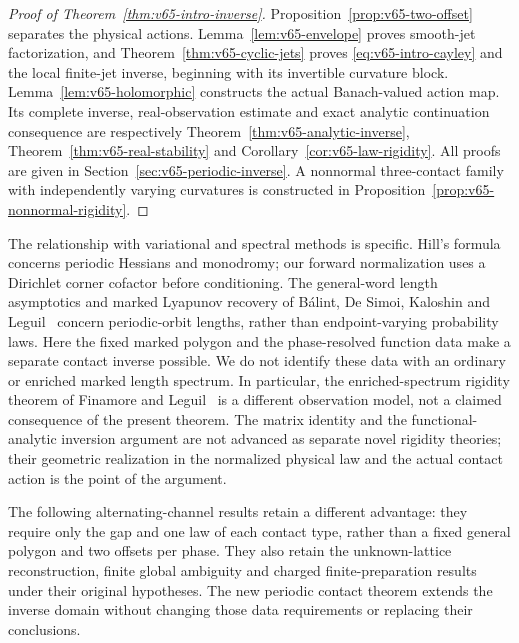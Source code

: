 \begin{proof}[Proof of Theorem~\ref{thm:v65-intro-inverse}]
Proposition~\ref{prop:v65-two-offset} separates the physical actions.
Lemma~\ref{lem:v65-envelope} proves smooth-jet factorization, and
Theorem~\ref{thm:v65-cyclic-jets} proves \eqref{eq:v65-intro-cayley}
and the local finite-jet inverse, beginning with its invertible
curvature block.  Lemma~\ref{lem:v65-holomorphic} constructs the
actual Banach-valued action map.  Its complete inverse, real-observation
estimate and exact analytic continuation consequence are respectively
Theorem~\ref{thm:v65-analytic-inverse},
Theorem~\ref{thm:v65-real-stability} and
Corollary~\ref{cor:v65-law-rigidity}.  All proofs are given in
Section~\ref{sec:v65-periodic-inverse}.  A nonnormal three-contact
family with independently varying curvatures is constructed in
Proposition~\ref{prop:v65-nonnormal-rigidity}.
\end{proof}

The relationship with variational and spectral methods is specific.
Hill's formula~\cite{Hill} concerns periodic Hessians and monodromy;
our forward normalization uses a Dirichlet corner cofactor before
conditioning.  The general-word length asymptotics and marked Lyapunov
recovery of B\'alint, De Simoi, Kaloshin and Leguil~\cite{BDKL}
concern periodic-orbit lengths, rather than endpoint-varying probability
laws.  Here the fixed marked polygon and the phase-resolved function data
make a separate contact inverse possible.  We do not identify these data
with an ordinary or enriched marked length spectrum.  In particular,
the enriched-spectrum rigidity theorem of Finamore and
Leguil~\cite{FinamoreLeguil} is a different observation model, not a
claimed consequence of the present theorem.  The matrix identity and
the functional-analytic inversion argument are not advanced as separate
novel rigidity theories; their geometric realization in the normalized
physical law and the actual contact action is the point of the argument.

The following alternating-channel results retain a different advantage:
they require only the gap and one law of each contact type, rather than
a fixed general polygon and two offsets per phase.  They also retain
the unknown-lattice reconstruction, finite global ambiguity and charged
finite-preparation results under their original hypotheses.  The new
periodic contact theorem extends the inverse domain without changing
those data requirements or replacing their conclusions.
